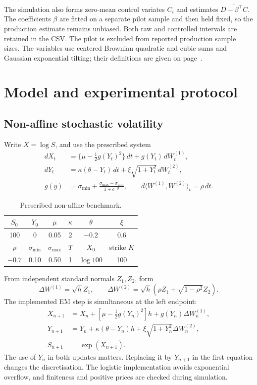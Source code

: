 \documentclass[11pt,a4paper]{article}
\begin{document}
The simulation also forms zero-mean control variates $C_i$ and estimates
$\overline{D-\beta^\top C}$. The coefficients $\beta$ are fitted on a separate pilot sample and then held fixed, so the production estimate remains unbiased. Both raw and controlled intervals are retained in the CSV. The pilot is excluded from reported production sample sizes. The variables use centered Brownian quadratic and cubic sums and Gaussian exponential tilting; their definitions are given on page~\pageref{sec:gbmweak}.

\newpage
\section{Model and experimental protocol}\label{sec:protocol}
\subsection{Non-affine stochastic volatility}
Write $X=\log S$, and use the prescribed system
\begin{align}
dX_t&=\{\mu-\tfrac12g(Y_t)^2\}\,dt+g(Y_t)\,dW_t^{(1)},\\
dY_t&=\kappa(\theta-Y_t)\,dt+\xi\sqrt{1+Y_t^2}\,dW_t^{(2)},\\
g(y)&=\sigma_{\min}+\frac{\sigma_{\max}-\sigma_{\min}}{1+e^{-y}},
\qquad d\langle W^{(1)},W^{(2)}\rangle_t=\rho\,dt.
\end{align}
\begin{table}[H]\centering
\caption{Prescribed non-affine benchmark.}
\begin{tabular}{cccccc}\toprule
$S_0$ & $Y_0$ & $\mu$ & $\kappa$ & $\theta$ & $\xi$\\\midrule
100 & 0 & 0.05 & 2 & $-0.2$ & 0.6\\\midrule
$\rho$ & $\sigma_{\min}$ & $\sigma_{\max}$ & $T$ & $X_0$ & strike $K$\\\midrule
$-0.7$ & 0.10 & 0.50 & 1 & $\log 100$ & 100\\\bottomrule
\end{tabular}
\end{table}
From independent standard normals $Z_1,Z_2$, form
\begin{equation}
\Delta W^{(1)}=\sqrt h Z_1,\qquad
\Delta W^{(2)}=\sqrt h(\rho Z_1+\sqrt{1-\rho^2}Z_2).
\end{equation}
The implemented EM step is simultaneous at the left endpoint:
\begin{align}
X_{n+1}&=X_n+[\mu-\tfrac12g(Y_n)^2]h+g(Y_n)\Delta W_n^{(1)},\\
Y_{n+1}&=Y_n+\kappa(\theta-Y_n)h+\xi\sqrt{1+Y_n^2}\Delta W_n^{(2)},\\
S_{n+1}&=\exp(X_{n+1}).
\end{align}
The use of $Y_n$ in both updates matters. Replacing it by $Y_{n+1}$ in the first equation changes the discretisation. The logistic implementation avoids exponential overflow, and finiteness and positive prices are checked during simulation.
\end{document}
